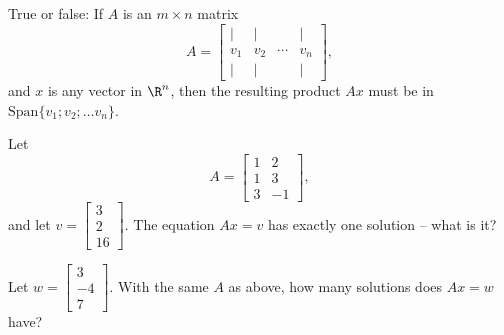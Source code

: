 \endedxproblem




     

True or false: If $A$ is an $m\times n$ matrix
\[ A = \left[ \begin{array}{cccc} | & | & & | \\ 
v_1 & v_2 & \cdots & v_n \\
 | & | & & | \end{array} \right], \]
 and $x$ is any vector in $\R^n$, then the resulting product $Ax$ must be in $\mathrm{Span}\{v_1; v_2; \ldots v_n\}$.  




\endedxproblem





\endedxvertical








Let  \[A = \left[ \begin{array}{cc} 1 & 2  \\ 
1 & 3 \\
3 & -1 \end{array} \right] ,\]
and let $v = \left[\begin{array}{c} 3 \\ 2 \\ 16 
\end{array} \right].$  The equation $Ax = v$ has exactly one solution -- what is it?  






Let $w = \left[\begin{array}{c} 3 \\ -4 \\ 7 
\end{array} \right].$  With the same $A$ as above, how many solutions does $Ax = w$ have?


